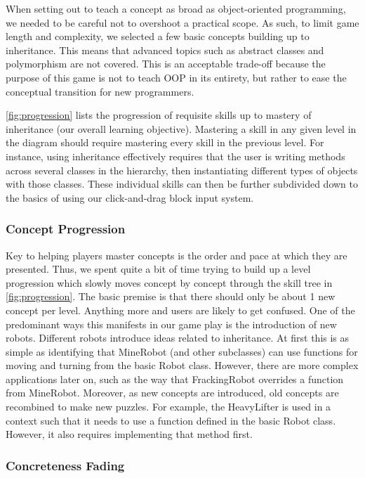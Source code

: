 \documentclass[12pt,notitlepage]{article}
\begin{document}
When setting out to teach a concept as broad as object-oriented
programming, we needed to be careful not to overshoot a practical
scope. As such, to limit game length and complexity, we selected a few
basic concepts building up to inheritance. This means that advanced topics
such as abstract classes and polymorphism are not covered. This is an
acceptable trade-off because the purpose of this game is not to teach
OOP in its entirety, but rather to ease the conceptual transition for
new programmers.

\autoref{fig:progression} lists the progression of requisite skills up
to mastery of inheritance (our overall learning objective). Mastering
a skill in any given level in the diagram should require mastering
every skill in the previous level. For instance, using inheritance
effectively requires that the user is writing methods across several
classes in the hierarchy, then instantiating different types of objects
with those classes. These individual skills can then be further subdivided
down to the basics of using our click-and-drag block input system.


\subsubsection{Concept Progression}

Key to helping players master concepts is the order and pace at which
they are presented. Thus, we spent quite a bit of time trying to build
up a level progression which slowly moves concept by concept through the
skill tree in \autoref{fig:progression}. The basic premise is that there
should only be about 1 new concept per level. Anything more and users are
likely to get confused. One of the predominant ways this manifests in our
game play is the introduction of new robots. Different robots introduce
ideas related to inheritance. At first this is as simple as identifying
that MineRobot (and other subclasses) can use functions for moving and
turning from the basic Robot class. However, there are more complex
applications later on, such as the way that FrackingRobot overrides a
function from MineRobot. Moreover, as new concepts are introduced, old
concepts are recombined to make new puzzles. For example, the HeavyLifter
is used in a context such that it needs to use a function defined in the
basic Robot class. However, it also requires implementing that method first.

\subsubsection{Concreteness Fading}
\end{document}
